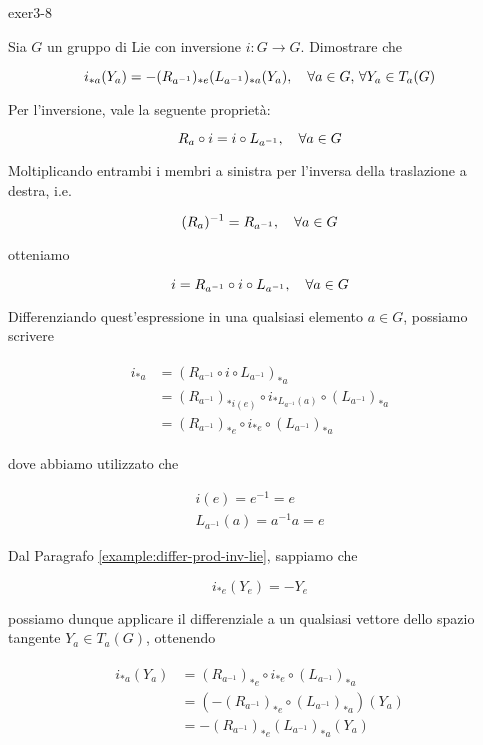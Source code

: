 {exer3-8}
{
Sia $ G $ un gruppo di Lie con inversione $ i : G \to G $. Dimostrare che

\begin{equation}
	i_{*a}(Y_{a}) = -(R_{a^{-1}})_{*e}(L_{a^{-1}})_{*a} (Y_{a}) %
	\qcomma \forall a \in G, \, \forall Y_{a} \in T_{a}(G)
\end{equation}
}
{
Per l'inversione, vale la seguente proprietà:

\begin{equation}
	R_{a} \circ i = i \circ L_{a^{-1}} \qcomma \forall a \in G
\end{equation}

Moltiplicando entrambi i membri a sinistra per l'inversa della traslazione a destra, i.e.

\begin{equation}
	(R_{a})^{-1} = R_{a^{-1}} \qcomma \forall a \in G
\end{equation}

otteniamo

\begin{equation}
	i = R_{a^{-1}} \circ i \circ L_{a^{-1}} \qcomma \forall a \in G
\end{equation}

Differenziando quest'espressione in una qualsiasi elemento $ a \in G $, possiamo scrivere

\begin{align}
	\begin{split}
		i_{*a} &= (R_{a^{-1}} \circ i \circ L_{a^{-1}})_{*a} \\
		&= (R_{a^{-1}})_{*i(e)} \circ i_{*L_{a^{-1}}(a)} \circ (L_{a^{-1}})_{*a} \\
		&= (R_{a^{-1}})_{*e} \circ i_{*e} \circ (L_{a^{-1}})_{*a}
	\end{split}
\end{align}

dove abbiamo utilizzato che

\begin{gather}
	i(e) = e^{-1} = e \\
	L_{a^{-1}}(a) = a^{-1} a = e
\end{gather}

Dal Paragrafo \ref{example:differ-prod-inv-lie}, sappiamo che

\begin{equation}
	i_{*e} (Y_{e}) = - Y_{e}
\end{equation}

possiamo dunque applicare il differenziale a un qualsiasi vettore dello spazio tangente $ Y_{a} \in T_{a}(G) $, ottenendo

\begin{align}
	\begin{split}
		i_{*a}(Y_{a}) &= (R_{a^{-1}})_{*e} \circ i_{*e} \circ (L_{a^{-1}})_{*a} \\
		&= (- (R_{a^{-1}})_{*e} \circ (L_{a^{-1}})_{*a}) (Y_{a}) \\
		&= - (R_{a^{-1}})_{*e} (L_{a^{-1}})_{*a} (Y_{a})
	\end{split}
\end{align}
}

